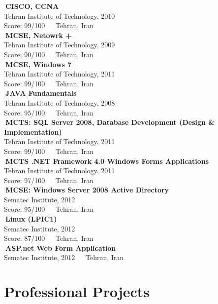 \documentclass[line,margin]{res}
\begin{document}
\begin{resume}
 \textbullet$~${\bf CISCO, CCNA}\\ Tehran Institute of Technology, 2010\\ 
 Score: 99/100 $~~~~$ \hfill  Tehran, Iran\\
 \textbullet$~${\bf MCSE, Netowrk +}\\  Tehran Institute of Technology, 2009\\ 
 Score: 90/100 $~~~~$ \hfill  Tehran, Iran\\
 \textbullet$~${\bf MCSE, Windows 7}\\  Tehran Institute of Technology, 2011\\ 
 Score: 99/100 $~~~~$ \hfill  Tehran, Iran\\
 \textbullet$~${\bf JAVA Fundamentals}\\  Tehran Institute of Technology, 2008\\
 Score: 95/100 $~~~~$ \hfill Tehran, Iran\\
 \textbullet$~${\bf MCTS: SQL Server 2008, Database Development (Design & Implementation)}\\  Tehran Institute of Technology, 2011\\
 Score: 99/100 $~~~~$ \hfill  Tehran, Iran\\
 \textbullet$~${\bf MCTS .NET Framework 4.0 Windows Forms Applications }\\ Tehran Institute of Technology, 2011\\
 Score: 97/100 $~~~~$ \hfill Tehran, Iran\\
 \textbullet$~${\bf MCSE: Windows Server 2008 Active Directory}\\ Sematec Institute, 2012\\ 
 Score: 95/100 $~~~~$ \hfill  Tehran, Iran\\
 \textbullet$~${\bf Linux (LPIC1)}\\  Sematec Institute, 2012\\ 
 Score: 87/100 $~~~~$ \hfill  Tehran, Iran\\
  \textbullet$~${\bf ASP.net Web Form Application}\\  Sematec Institute, 2012 $~~~~$ \hfill Tehran, Iran\\
 

 

\section{Professional Projects}


\end{resume}
\end{document}
